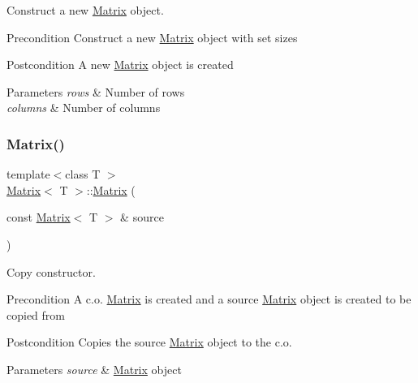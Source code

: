 Construct a new \mbox{\hyperlink{class_matrix}{Matrix}} object. 

\begin{DoxyPrecond}{Precondition}
Construct a new \mbox{\hyperlink{class_matrix}{Matrix}} object with set sizes 
\end{DoxyPrecond}
\begin{DoxyPostcond}{Postcondition}
A new \mbox{\hyperlink{class_matrix}{Matrix}} object is created 
\end{DoxyPostcond}

\begin{DoxyParams}{Parameters}
{\em rows} & Number of rows \\
\hline
{\em columns} & Number of columns \\
\hline
\end{DoxyParams}
\mbox{\label{class_matrix_abc1e84ee28720ecc8a6807bb3f09f43e}} 
\subsubsection{\texorpdfstring{Matrix()}{Matrix()}\hspace{0.1cm}{\footnotesize\ttfamily [3/3]}}
{\footnotesize\ttfamily template$<$class T $>$ \\
\mbox{\hyperlink{class_matrix}{Matrix}}$<$ T $>$\+::\mbox{\hyperlink{class_matrix}{Matrix}} (\begin{DoxyParamCaption}\item[{const \mbox{\hyperlink{class_matrix}{Matrix}}$<$ T $>$ \&}]{source }\end{DoxyParamCaption})}



Copy constructor. 

\begin{DoxyPrecond}{Precondition}
A c.\+o. \mbox{\hyperlink{class_matrix}{Matrix}} is created and a source \mbox{\hyperlink{class_matrix}{Matrix}} object is created to be copied from 
\end{DoxyPrecond}
\begin{DoxyPostcond}{Postcondition}
Copies the source \mbox{\hyperlink{class_matrix}{Matrix}} object to the c.\+o. 
\end{DoxyPostcond}

\begin{DoxyParams}{Parameters}
{\em source} & \mbox{\hyperlink{class_matrix}{Matrix}} object \\
\hline
\end{DoxyParams}
\mbox{\label{class_matrix_a91aa704de674203e96aece9e1955ccd3}} 
